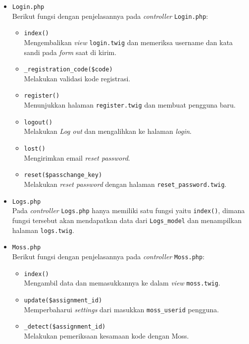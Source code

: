 \begin{itemize}
\begin{itemize}
	      

	\item \verb|Login.php| \\
	      Berikut fungsi dengan penjelasannya pada \textit{controller} \verb|Login.php|:

	      \begin{itemize}
		      \item \verb|index()| \\
		            Mengembalikan \textit{view} \verb|login.twig| dan memeriksa username dan kata sandi pada \textit{form} saat di kirim. 

		            
		      \item \verb|_registration_code($code)| \\
		            Melakukan validasi kode registrasi.
		      \item \verb|register()| \\
		            Menunjukkan halaman \verb|register.twig| dan membuat pengguna baru.
		      \item \verb|logout()| \\
		            Melakukan \textit{Log out} dan mengalihkan ke halaman \textit{login}.
		      \item \verb|lost()| \\
		            Mengirimkan email \textit{reset password}.
		      \item \verb|reset($passchange_key)| \\
		            Melakukan \textit{reset password} dengan halaman \verb|reset_password.twig|.

	      \end{itemize}

	\item \verb|Logs.php| \\
	      Pada \textit{controller} \verb|Logs.php| hanya memiliki satu fungsi yaitu \verb|index()|, dimana fungsi tersebut akan mendapatkan data dari \verb|Logs_model| dan menampilkan halaman \verb|logs.twig|. 



	\item \verb|Moss.php| \\
	      Berikut fungsi dengan penjelasannya pada \textit{controller} \verb|Moss.php|:

	      \begin{itemize}
		      \item \verb|index()| \\
		            Mengambil data dan memasukkannya ke dalam \textit{view} \verb|moss.twig|.
		      \item \verb|update($assignment_id)| \\
		            Memperbaharui \textit{settings} dari masukkan \verb|moss_userid| pengguna.
		      \item \verb|_detect($assignment_id)| \\
		            Melakukan pemeriksaan kesamaan kode dengan Moss.


\end{itemize}
\end{itemize}
\end{itemize}
